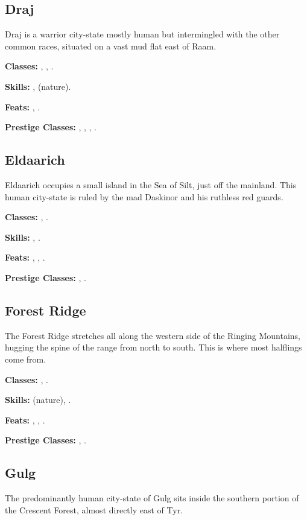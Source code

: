 \subsection{Draj}
Draj is a warrior city-state mostly human but intermingled with the other common races, situated on a vast mud flat east of Raam.

\textbf{Classes:} , , .

\textbf{Skills:} ,  (nature).

\textbf{Feats:} , .

\textbf{Prestige Classes:} , , , .

\subsection{Eldaarich}
Eldaarich occupies a small island in the Sea of Silt, just off the mainland. This human city-state is ruled by the mad Daskinor and his ruthless red guards.

\textbf{Classes:} , .

\textbf{Skills:} , .

\textbf{Feats:} , , .

\textbf{Prestige Classes:} , .


\subsection{Forest Ridge}
The Forest Ridge stretches all along the western side of the Ringing Mountains, hugging the spine of the range from north to south. This is where most halflings come from.

\textbf{Classes:} , .

\textbf{Skills:}  (nature), .

\textbf{Feats:} , , .

\textbf{Prestige Classes:} , .


\subsection{Gulg}
The predominantly human city-state of Gulg sits inside the southern portion of the Crescent Forest, almost directly east of Tyr.

